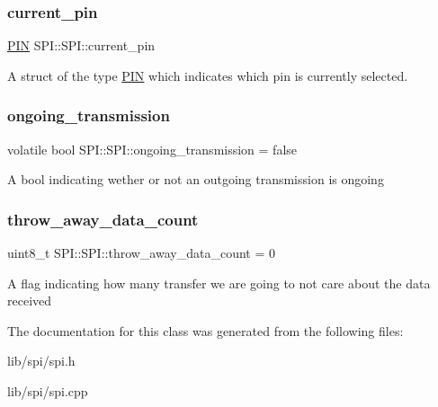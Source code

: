 \subsubsection{\texorpdfstring{current\+\_\+pin}{current\_pin}}
{\footnotesize\ttfamily \hyperlink{struct_s_p_i_1_1_p_i_n}{P\+IN} S\+P\+I\+::\+S\+P\+I\+::current\+\_\+pin}

A struct of the type \hyperlink{struct_s_p_i_1_1_p_i_n}{P\+IN} which indicates which pin is currently selected. \hypertarget{class_s_p_i_1_1_s_p_i_a965dfd15d040742db8fc022535e95a61}{}\label{class_s_p_i_1_1_s_p_i_a965dfd15d040742db8fc022535e95a61} 
\subsubsection{\texorpdfstring{ongoing\+\_\+transmission}{ongoing\_transmission}}
{\footnotesize\ttfamily volatile bool S\+P\+I\+::\+S\+P\+I\+::ongoing\+\_\+transmission = false\hspace{0.3cm}{\ttfamily [private]}}

A bool indicating wether or not an outgoing transmission is ongoing \hypertarget{class_s_p_i_1_1_s_p_i_a997d2f4abbb126ec00ba3a4abe2940ac}{}\label{class_s_p_i_1_1_s_p_i_a997d2f4abbb126ec00ba3a4abe2940ac} 
\subsubsection{\texorpdfstring{throw\+\_\+away\+\_\+data\+\_\+count}{throw\_away\_data\_count}}
{\footnotesize\ttfamily uint8\+\_\+t S\+P\+I\+::\+S\+P\+I\+::throw\+\_\+away\+\_\+data\+\_\+count = 0\hspace{0.3cm}{\ttfamily [private]}}

A flag indicating how many transfer we are going to not care about the data received 

The documentation for this class was generated from the following files\+:\begin{DoxyCompactItemize}
\item 
lib/spi/spi.\+h\item 
lib/spi/spi.\+cpp\end{DoxyCompactItemize}
